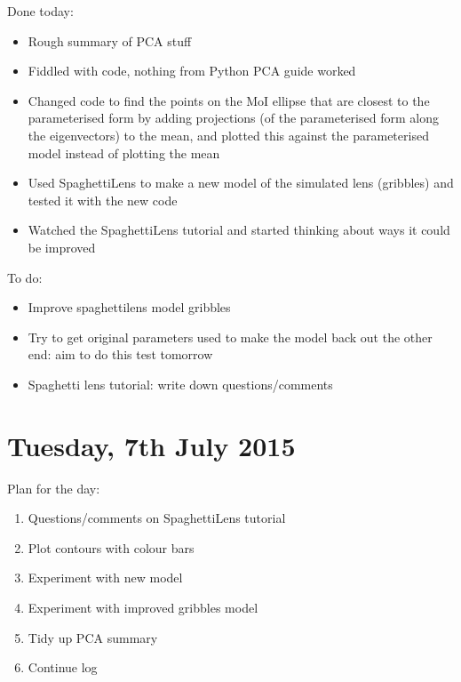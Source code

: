 \documentclass{article}
\begin{document}
\noindent Done today:
\begin{itemize}
  \item Rough summary of PCA stuff
  \item Fiddled with code, nothing from Python PCA guide worked
  \item Changed code to find the points on the MoI ellipse that are closest to the parameterised form by adding projections (of the parameterised form along the eigenvectors) to the mean, and plotted this against the parameterised model instead of plotting the mean
  \item Used SpaghettiLens to make a new model of the simulated lens (gribbles) and tested it with the new code
  \item Watched the SpaghettiLens tutorial and started thinking about ways it could be improved
\end{itemize}

\noindent To do:
\begin{itemize}
  \item Improve spaghettilens model gribbles
  \item Try to get original parameters used to make the model back out the other end: aim to do this test tomorrow
  \item Spaghetti lens tutorial: write down questions/comments
\end{itemize}\newpage

\section{Tuesday, 7th July 2015}
\noindent Plan for the day:
\begin{enumerate}
  \item Questions/comments on SpaghettiLens tutorial
  \item Plot contours with colour bars
  \item Experiment with new model
  \item Experiment with improved gribbles model
  \item Tidy up PCA summary
  \item Continue log
\end{enumerate}
\end{document}
